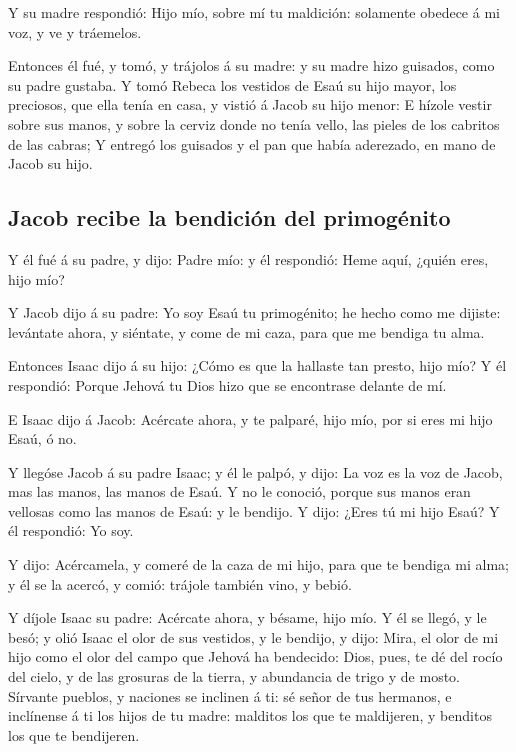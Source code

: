  Y su madre respondió: Hijo mío, sobre mí tu maldición:
solamente obedece á mi voz, y ve y tráemelos.

 Entonces él fué, y tomó, y trájolos á su madre: y su madre
hizo guisados, como su padre gustaba.  Y tomó Rebeca los
vestidos de Esaú su hijo mayor, los preciosos, que ella tenía en casa, y
vistió á Jacob su hijo menor:  E hízole vestir sobre sus
manos, y sobre la cerviz donde no tenía vello, las pieles de los
cabritos de las cabras;  Y entregó los guisados y el pan
que había aderezado, en mano de Jacob su hijo.

\hypertarget{jacob-recibe-la-bendiciuxf3n-del-primoguxe9nito}{%
\subsection{Jacob recibe la bendición del
primogénito}\label{jacob-recibe-la-bendiciuxf3n-del-primoguxe9nito}}

 Y él fué á su padre, y dijo: Padre mío: y él respondió:
Heme aquí, ¿quién eres, hijo mío?

 Y Jacob dijo á su padre: Yo soy Esaú tu primogénito; he
hecho como me dijiste: levántate ahora, y siéntate, y come de mi caza,
para que me bendiga tu alma.

 Entonces Isaac dijo á su hijo: ¿Cómo es que la hallaste
tan presto, hijo mío? Y él respondió: Porque Jehová tu Dios hizo que se
encontrase delante de mí.

 E Isaac dijo á Jacob: Acércate ahora, y te palparé, hijo
mío, por si eres mi hijo Esaú, ó no.

 Y llegóse Jacob á su padre Isaac; y él le palpó, y dijo:
La voz es la voz de Jacob, mas las manos, las manos de Esaú.
 Y no le conoció, porque sus manos eran vellosas como las
manos de Esaú: y le bendijo.  Y dijo: ¿Eres tú mi hijo
Esaú? Y él respondió: Yo soy.

 Y dijo: Acércamela, y comeré de la caza de mi hijo, para
que te bendiga mi alma; y él se la acercó, y comió: trájole también
vino, y bebió.

 Y díjole Isaac su padre: Acércate ahora, y bésame, hijo
mío.  Y él se llegó, y le besó; y olió Isaac el olor de sus
vestidos, y le bendijo, y dijo: Mira, el olor de mi hijo como el olor
del campo que Jehová ha bendecido:  Dios, pues, te dé del
rocío del cielo, y de las grosuras de la tierra, y abundancia de trigo y
de mosto.  Sírvante pueblos, y naciones se inclinen á ti:
sé señor de tus hermanos, e inclínense á ti los hijos de tu madre:
malditos los que te maldijeren, y benditos los que te bendijeren.

